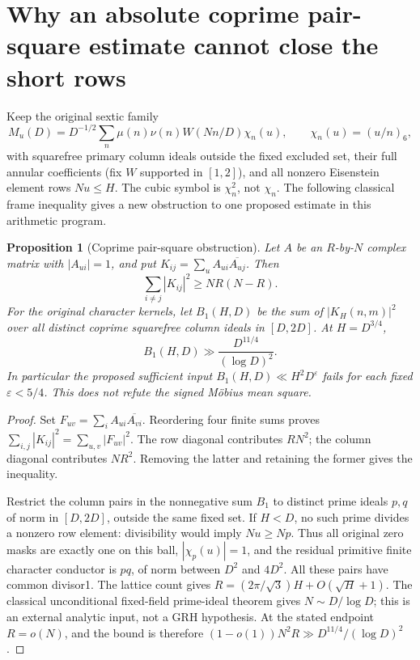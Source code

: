 \documentclass[11pt,oneside,openany]{book}
\newtheorem{proposition}[theorem]{Proposition}
\theoremstyle{definition}\newtheorem{definition}[theorem]{Definition}
\theoremstyle{remark}\newtheorem{remark}[theorem]{Remark}
\begin{document}
\section{Why an absolute coprime pair-square estimate cannot close the short rows}
\label{sec:pair-barrier}
Keep the original sextic family
\[
 M_u(D)=D^{-1/2}\sum_n\mu(n)\nu(n)W(Nn/D)\chi_n(u),
 \qquad \chi_n(u)=(u/n)_6,
\]
with squarefree primary column ideals outside the fixed excluded set,
their full annular coefficients (fix $W$ supported in $[1,2]$), and all
nonzero Eisenstein element rows
$Nu\le H$. The cubic symbol is $\chi_n^2$, not $\chi_n$.
The following classical frame inequality \cite{WelchGeometry} gives a new
obstruction to one proposed estimate in this arithmetic program.

\begin{proposition}[Coprime pair-square obstruction]\label{prop:pair-barrier}
Let $A$ be an $R$-by-$N$ complex matrix with $|A_{ui}|=1$, and put
$K_{ij}=\sum_u A_{ui}\overline{A_{uj}}$. Then
\[
 \sum_{i\ne j}|K_{ij}|^2\ge NR(N-R).
\]
For the original character kernels, let $B_1(H,D)$ be the sum of
$|K_H(n,m)|^2$ over all distinct coprime squarefree column ideals in
$[D,2D]$. At $H=D^{3/4}$,
\[
 B_1(H,D)\gg \frac{D^{11/4}}{(\log D)^2}.
\]
In particular the proposed sufficient input
$B_1(H,D)\ll H^2D^\varepsilon$ fails for each fixed $\varepsilon<5/4$.
This does not refute the signed M\"obius mean square.
\end{proposition}
\begin{proof}
Set $F_{uv}=\sum_i A_{ui}\overline{A_{vi}}$. Reordering four finite sums
proves $\sum_{i,j}|K_{ij}|^2=\sum_{u,v}|F_{uv}|^2$.
The row diagonal contributes $RN^2$; the column diagonal contributes
$NR^2$. Removing the latter and retaining the former gives the inequality.

Restrict the column pairs in the nonnegative sum $B_1$ to distinct prime
ideals $p,q$ of norm in $[D,2D]$, outside the same fixed set. If $H<D$,
no such prime divides a nonzero row element: divisibility would imply
$Nu\ge Np$. Thus all original zero masks are exactly one on this ball,
$|\chi_p(u)|=1$, and the residual primitive finite character conductor is
$pq$, of norm between $D^2$ and $4D^2$. All these pairs have common divisor1.
The lattice count gives $R=(2\pi/\sqrt3)H+O(\sqrt H+1)$.
The classical unconditional fixed-field prime-ideal theorem gives
$N\sim D/\log D$; this is an external analytic input, not a GRH hypothesis.
At the stated endpoint $R=o(N)$, and the bound is therefore
$(1-o(1))N^2R\gg D^{11/4}/(\log D)^2$.
\end{proof}
\end{document}
